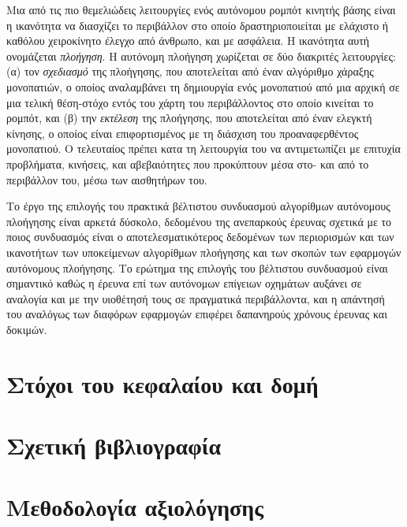 Μια από τις πιο θεμελιώδεις λειτουργίες ενός αυτόνομου ρομπότ κινητής βάσης
είναι η ικανότητα να διασχίζει το περιβάλλον στο οποίο δραστηριοποιείται με
ελάχιστο ή καθόλου χειροκίνητο έλεγχο από άνθρωπο, και με ασφάλεια. Η ικανότητα
αυτή ονομάζεται \textit{πλοήγηση}. Η αυτόνομη πλοήγηση χωρίζεται σε δύο
διακριτές λειτουργίες: (α) τον \textit{σχεδιασμό} της πλοήγησης, που
αποτελείται από έναν αλγόριθμο χάραξης μονοπατιών, ο οποίος αναλαμβάνει τη
δημιουργία ενός μονοπατιού από μια αρχική σε μια τελική θέση-στόχο εντός του
χάρτη του περιβάλλοντος στο οποίο κινείται το ρομπότ, και (β) την
\textit{εκτέλεση} της πλοήγησης, που αποτελείται από έναν ελεγκτή κίνησης, ο
οποίος είναι επιφορτισμένος με τη διάσχιση του προαναφερθέντος μονοπατιού. Ο
τελευταίος πρέπει κατα τη λειτουργία του να αντιμετωπίζει με επιτυχία
προβλήματα, κινήσεις, και αβεβαιότητες που προκύπτουν μέσα στο- και από το
περιβάλλον του, μέσω των αισθητήρων του.

Το έργο της επιλογής του πρακτικά βέλτιστου συνδυασμού αλγορίθμων αυτόνομους
πλοήγησης είναι αρκετά δύσκολο, δεδομένου της ανεπαρκούς έρευνας σχετικά με το
ποιος συνδυασμός είναι ο αποτελεσματικότερος δεδομένων των περιορισμών και των
ικανοτήτων των υποκείμενων αλγορίθμων πλοήγησης και των σκοπών των εφαρμογών
αυτόνομους πλοήγησης. Το ερώτημα της επιλογής του βέλτιστου συνδυασμού είναι
σημαντικό καθώς η έρευνα επί των αυτόνομων επίγειων οχημάτων αυξάνει σε
αναλογία και με την υιοθέτησή τους σε πραγματικά περιβάλλοντα, και η απάντησή
του αναλόγως των διαφόρων εφαρμογών επιφέρει δαπανηρούς χρόνους έρευνας και
δοκιμών.

\section{Στόχοι του κεφαλαίου και δομή}
  \label{section:02_01_01}
  

\section{Σχετική βιβλιογραφία}
  \label{section:02_01_02}
  

\section{Μεθοδολογία αξιολόγησης}
  \label{section:02_01_03}
  

